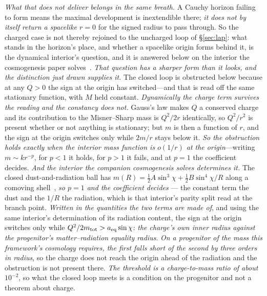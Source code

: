 \documentclass[11pt,a4paper]{article}
\theoremstyle{definition}
\begin{document}
\emph{What that does not deliver belongs in the same breath.} A Cauchy horizon failing to form means the
maximal development is inextendible there; \emph{it does not by itself return a spacelike $r=0$} for the
signed radius to pass through. So the charged case is not thereby rejoined to the uncharged loop of
\S\ref{sec:lap}: what stands in the horizon's place, and whether a spacelike origin forms behind it, is
the dynamical interior's question, and it is answered below on the interior the cosmogenesis paper solves~\cite{JanzenCosmogenesis}. \emph{That question has a sharper form than it looks, and the distinction just drawn supplies it.} The closed loop is obstructed below because at any $Q>0$ the sign at the origin has switched---and that is read off the same stationary function, with $M$ held constant. \emph{Dynamically the charge term survives the reading and the constancy does not.} Gauss's law makes $Q$ a conserved charge and its contribution to the Misner--Sharp mass is $Q^{2}/2r$ identically, so $Q^{2}/r^{2}$ is present whether or not anything is stationary; but $m$ is then a function of $r$, and the sign at the origin switches only while $2m/r$ stays below it. \emph{So the obstruction holds exactly when the interior mass function is $o(1/r)$ at the origin}---writing $m\sim kr^{-p}$, for $p<1$ it holds, for $p>1$ it fails, and at $p=1$ the coefficient decides. \emph{And the interior the companion cosmogenesis solves determines it.} The closed dust-and-radiation ball
has $m(R)=\tfrac12A\sin^{3}\chi+\tfrac12B\sin^{4}\chi/R$ along a comoving shell~\cite{JanzenCosmogenesis},
\emph{so $p=1$ and the coefficient decides} --- the constant term the dust and the $1/R$ the radiation, which
is that interior's parity split read at the branch point. \emph{Written in the quantities the two terms are
made of}, and using the same interior's determination of its radiation content, the sign at the origin
switches only while $Q^{2}/2m_{\rm tot}>a_{\rm eq}\sin\chi$: \emph{the charge's own inner radius against the
progenitor's matter--radiation equality
radius}.
\emph{On a progenitor of the mass this framework's cosmology requires, the first falls short of the second by
three orders in radius}, so the charge does not reach the origin ahead of the radiation and the obstruction is
not present there. \emph{The threshold is a charge-to-mass ratio of about $10^{-2}$}, so what the closed loop
meets is a condition on the progenitor and not a theorem about charge.
\end{document}
